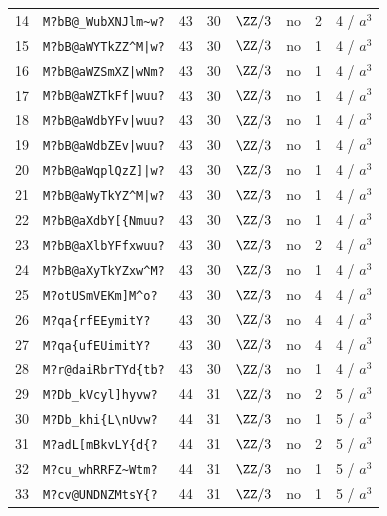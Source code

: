 \begin{longtable}{@{}llrrlcrl@{}}
14 & \texttt{M?bB@\_WubXNJlm\textasciitilde{}w?} & 43 & 30 & $\ZZ/3$ & no & 2 & 4 / $a^{3}$ \\
15 & \texttt{M?bB@aWYTkZZ\textasciicircum{}M|w?} & 43 & 30 & $\ZZ/3$ & no & 1 & 4 / $a^{3}$ \\
16 & \texttt{M?bB@aWZSmXZ|wNm?} & 43 & 30 & $\ZZ/3$ & no & 1 & 4 / $a^{3}$ \\
17 & \texttt{M?bB@aWZTkFf|wuu?} & 43 & 30 & $\ZZ/3$ & no & 1 & 4 / $a^{3}$ \\
18 & \texttt{M?bB@aWdbYFv|wuu?} & 43 & 30 & $\ZZ/3$ & no & 1 & 4 / $a^{3}$ \\
19 & \texttt{M?bB@aWdbZEv|wuu?} & 43 & 30 & $\ZZ/3$ & no & 1 & 4 / $a^{3}$ \\
20 & \texttt{M?bB@aWqplQzZ]|w?} & 43 & 30 & $\ZZ/3$ & no & 1 & 4 / $a^{3}$ \\
21 & \texttt{M?bB@aWyTkYZ\textasciicircum{}M|w?} & 43 & 30 & $\ZZ/3$ & no & 1 & 4 / $a^{3}$ \\
22 & \texttt{M?bB@aXdbY[\{Nmuu?} & 43 & 30 & $\ZZ/3$ & no & 1 & 4 / $a^{3}$ \\
23 & \texttt{M?bB@aXlbYFfxwuu?} & 43 & 30 & $\ZZ/3$ & no & 2 & 4 / $a^{3}$ \\
24 & \texttt{M?bB@aXyTkYZxw\textasciicircum{}M?} & 43 & 30 & $\ZZ/3$ & no & 1 & 4 / $a^{3}$ \\
25 & \texttt{M?otU\textasciigrave{}SmVEKm]M\textasciicircum{}o?} & 43 & 30 & $\ZZ/3$ & no & 4 & 4 / $a^{3}$ \\
26 & \texttt{M?qa\textasciigrave{}\textasciigrave{}\{rfEEymitY?} & 43 & 30 & $\ZZ/3$ & no & 4 & 4 / $a^{3}$ \\
27 & \texttt{M?qa\textasciigrave{}\textasciigrave{}\{ufEUimitY?} & 43 & 30 & $\ZZ/3$ & no & 4 & 4 / $a^{3}$ \\
28 & \texttt{M?r@daiRbrTYd\{tb?} & 43 & 30 & $\ZZ/3$ & no & 1 & 4 / $a^{3}$ \\
29 & \texttt{M?\textasciigrave{}Db\_kVcyl]hyvw?} & 44 & 31 & $\ZZ/3$ & no & 2 & 5 / $a^{3}$ \\
30 & \texttt{M?\textasciigrave{}Db\_khi\{L\textbackslash{}nUvw?} & 44 & 31 & $\ZZ/3$ & no & 1 & 5 / $a^{3}$ \\
31 & \texttt{M?\textasciigrave{}adL[mBkvLY\{d\{?} & 44 & 31 & $\ZZ/3$ & no & 2 & 5 / $a^{3}$ \\
32 & \texttt{M?\textasciigrave{}cu\_whRRFZ\textasciitilde{}Wtm?} & 44 & 31 & $\ZZ/3$ & no & 1 & 5 / $a^{3}$ \\
33 & \texttt{M?\textasciigrave{}cv@UNDNZMtsY\{?} & 44 & 31 & $\ZZ/3$ & no & 1 & 5 / $a^{3}$ \\

\end{longtable}
